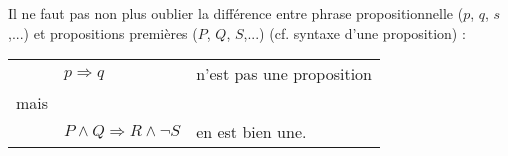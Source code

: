 			Il ne faut pas non plus oublier la différence entre phrase propositionnelle ($p$, $q$, $s$,...) et propositions premières ($P$, $Q$, $S$,...) (cf. syntaxe d'une proposition) :
			\begin{center}
			\begin{tabular}{lll}
				& $p \Rightarrow q$ & n'est pas une proposition\\
				
				mais &&\\
				&$P \land Q \Rightarrow R \land \lnot S$ & en est bien une.\\
			\end{tabular}
			\end{center}
	
